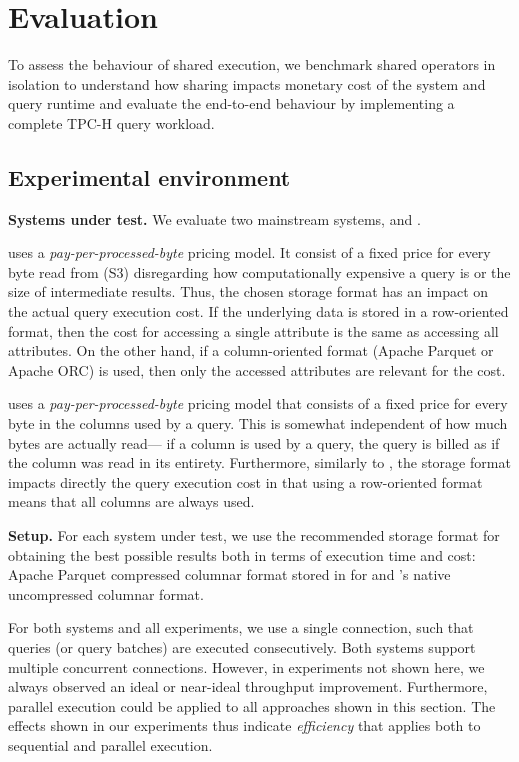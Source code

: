 \section{Evaluation}
\label{sec:exp_env}

To assess the behaviour of shared execution,
we benchmark shared operators in isolation to understand
how sharing impacts monetary cost of the system and query runtime
and evaluate the end-to-end behaviour by implementing a complete TPC-H
query workload.


\subsection{Experimental environment}

\textbf{Systems under test.} We evaluate two mainstream \qaasl systems,
\athena and \bigquery.

\athena uses a {\it pay-per-processed-byte} pricing model.
It consist of a fixed price for every byte read from \sss (S3) disregarding
how computationally expensive a query is or the size of intermediate results.
Thus, the chosen storage format has an impact on the actual query execution
cost. If the underlying data is stored in a row-oriented format, then the cost
for accessing a single attribute is the same as accessing all attributes. On
the other hand, if a column-oriented format (Apache Parquet or Apache ORC)
is used, then only the accessed attributes are relevant for the cost.

\bigquery uses a {\it pay-per-processed-byte} pricing model
that consists of a fixed price for every byte in the columns used by a query.
This is somewhat independent of how much bytes are actually read---%
if a column is used by a query, the query is billed
as if the column was read in its entirety.
Furthermore, similarly to \athena,
the storage format impacts directly the query execution cost
in that using a row-oriented format means that all columns are always used.

\textbf{Setup.} For each system under test, we use the recommended storage
format for obtaining the best possible results both in terms of execution time
and cost: Apache Parquet compressed columnar format stored in \sss for \athena
and \bigquery's native uncompressed columnar format.

For both systems and all experiments, we use a single connection,
such that queries (or query batches) are executed consecutively.
Both systems support multiple concurrent connections.
However, in experiments not shown here, we always observed
an ideal or near-ideal throughput improvement.
Furthermore, parallel execution could be applied to all approaches
shown in this section.
The effects shown in our experiments thus indicate \emph{efficiency}
that applies both to sequential and parallel execution.

